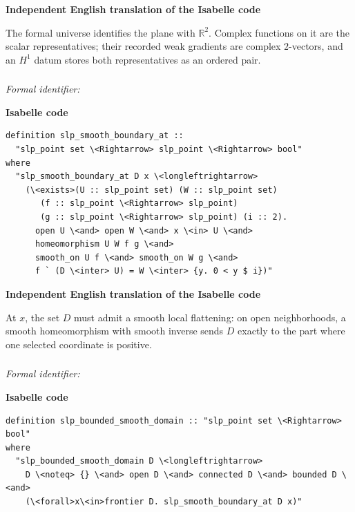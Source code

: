 \documentclass[10pt,oneside]{article}
\newcommand{\reviewlabel}[1]{\par\smallskip\noindent\textsf{\bfseries #1}\par\smallskip}
\begin{document}
\reviewlabel{Independent English translation of the Isabelle code}
The formal universe identifies the plane with $\mathbb{R}^2$. Complex functions on it are the scalar representatives; their recorded weak gradients are complex $2$-vectors, and an $H^1$ datum stores both representatives as an ordered pair.

\subsubsection{\texttt{}}
\noindent\textit{Formal identifier:} \texttt{}

\reviewlabel{Isabelle code}
\begin{lstlisting}
definition slp_smooth_boundary_at ::
  "slp_point set \<Rightarrow> slp_point \<Rightarrow> bool"
where
  "slp_smooth_boundary_at D x \<longleftrightarrow>
    (\<exists>(U :: slp_point set) (W :: slp_point set)
       (f :: slp_point \<Rightarrow> slp_point)
       (g :: slp_point \<Rightarrow> slp_point) (i :: 2).
      open U \<and> open W \<and> x \<in> U \<and>
      homeomorphism U W f g \<and>
      smooth_on U f \<and> smooth_on W g \<and>
      f ` (D \<inter> U) = W \<inter> {y. 0 < y $ i})"
\end{lstlisting}

\reviewlabel{Independent English translation of the Isabelle code}
At $x$, the set $D$ must admit a smooth local flattening: on open neighborhoods, a smooth homeomorphism with smooth inverse sends $D$ exactly to the part where one selected coordinate is positive.

\subsubsection{\texttt{}}
\noindent\textit{Formal identifier:} \texttt{}

\reviewlabel{Isabelle code}
\begin{lstlisting}
definition slp_bounded_smooth_domain :: "slp_point set \<Rightarrow> bool"
where
  "slp_bounded_smooth_domain D \<longleftrightarrow>
    D \<noteq> {} \<and> open D \<and> connected D \<and> bounded D \<and>
    (\<forall>x\<in>frontier D. slp_smooth_boundary_at D x)"
\end{lstlisting}
\end{document}

